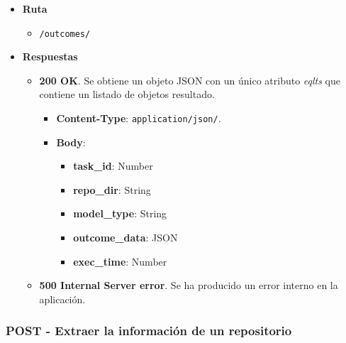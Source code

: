 \begin{itemize}
    \item[] \textbf{Ruta}
        \begin{itemize} \setlength\itemsep{0.2em}
            \item[] \texttt{/outcomes/}
        \end{itemize}
    \item[] \textbf{Respuestas}
        \begin{itemize} \setlength\itemsep{0.2em}
            \item[] \textbf{200 OK}. Se obtiene un objeto JSON con un único atributo \textit{eqlts} que contiene un listado de objetos resultado.
                \begin{itemize} \setlength\itemsep{0.2em}
                    \item[] \textbf{Content-Type}: \texttt{application/json/}.
                    \item[] \textbf{Body}: 
                        \begin{itemize} \setlength\itemsep{0.2em}
                            \item[] \textbf{task\_id}: Number
                            \item[] \textbf{repo\_dir}: String
                            \item[] \textbf{model\_type}: String
                            \item[] \textbf{outcome\_data}: JSON
                            \item[] \textbf{exec\_time}: Number
                        \end{itemize}
                \end{itemize}
            \item[] \textbf{500 Internal Server error}. Se ha producido un error interno en la aplicación.
        \end{itemize}
\end{itemize}

\subsubsection{POST - Extraer la información de un repositorio}

